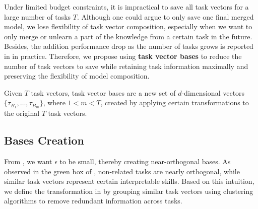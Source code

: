 Under limited budget constraints, it is impractical to save all task vectors for a large number of tasks $T$. Although one could argue to only save one final merged model, we lose flexibility of task vector composition, especially when we want to only merge or unlearn a part of the knowledge from a certain task in the future. Besides, the addition performance drop as the number of tasks grows is reported in \citet{ilharco2022editing} in practice. Therefore, we propose using \textbf{task vector bases} to reduce the number of task vectors to save while retaining task information maximally and preserving the flexibility of model composition.

\begin{definition}
    Given $T$ task vectors, task vector bases are a new set of $d$-dimensional vectors $\{\tau_{B_1}, \dots, \tau_{B_m}\}$, where $1 < m < T$, created by applying certain transformations to the original $T$ task vectors.
    \label{def:basis}
\end{definition}

\subsection{Bases Creation}
\label{sec:bases_creation}

From , we want $\epsilon$ to be small, thereby creating near-orthogonal bases. As observed in the green box of , non-related tasks are nearly orthogonal, while similar task vectors represent certain interpretable skills. Based on this intuition, we define the transformation in  by grouping similar task vectors using clustering algorithms to remove redundant information across tasks.

